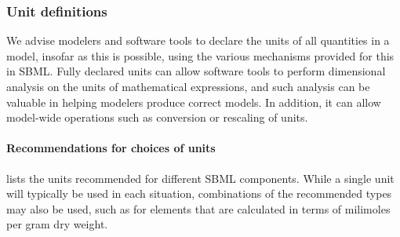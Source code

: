 \subsubsection{Unit definitions}
\label{sec:bp:unitdefinitions}

We advise modelers and software tools to declare the units of all
quantities in a model, insofar as this is possible, using the
various mechanisms provided for this in SBML.  Fully declared
units can allow software tools to perform dimensional analysis on
the units of mathematical expressions, and such analysis can be
valuable in helping modelers produce correct models.  In addition,
it can allow model-wide operations such as conversion or rescaling
of units.


\paragraph{Recommendations for choices of units}
\label{sec:bp:unitdefinitions:recommendedunits}

 lists the units recommended for
different SBML components.  While a single unit will typically be used in each situation, combinations of the recommended types may also be used, such as  for  elements that are calculated in terms of milimoles per gram dry weight.

